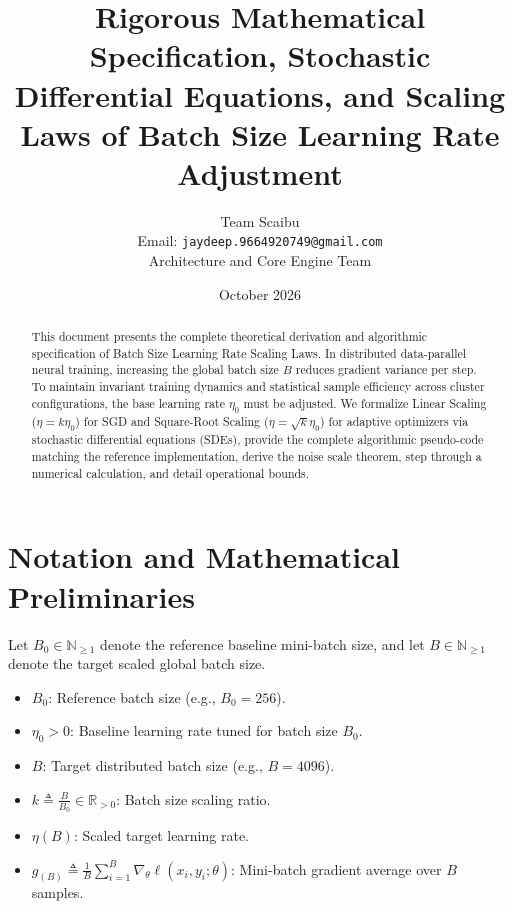 \documentclass[11pt,a4paper]{article}
\title{\textbf{Rigorous Mathematical Specification, Stochastic Differential Equations, and Scaling Laws of Batch Size Learning Rate Adjustment}}
\author{Team Scaibu \\ \small Email: \texttt{jaydeep.9664920749@gmail.com} \\ \small Architecture and Core Engine Team}
\date{October 2026}
\theoremstyle{definition}
\begin{document}
\maketitle

\begin{abstract}
This document presents the complete theoretical derivation and algorithmic specification of Batch Size Learning Rate Scaling Laws. In distributed data-parallel neural training, increasing the global batch size $B$ reduces gradient variance per step. To maintain invariant training dynamics and statistical sample efficiency across cluster configurations, the base learning rate $\eta_0$ must be adjusted. We formalize Linear Scaling ($\eta = k \eta_0$) for SGD and Square-Root Scaling ($\eta = \sqrt{k} \eta_0$) for adaptive optimizers via stochastic differential equations (SDEs), provide the complete algorithmic pseudo-code matching the reference implementation, derive the noise scale theorem, step through a numerical calculation, and detail operational bounds.
\end{abstract}

\section{Notation and Mathematical Preliminaries}

Let $B_0 \in \mathbb{N}_{\ge 1}$ denote the reference baseline mini-batch size, and let $B \in \mathbb{N}_{\ge 1}$ denote the target scaled global batch size.

\begin{itemize}
    \item $B_0$: Reference batch size (e.g., $B_0 = 256$).
    \item $\eta_0 > 0$: Baseline learning rate tuned for batch size $B_0$.
    \item $B$: Target distributed batch size (e.g., $B = 4096$).
    \item $k \triangleq \frac{B}{B_0} \in \mathbb{R}_{> 0}$: Batch size scaling ratio.
    \item $\eta(B)$: Scaled target learning rate.
    \item $g_{(B)} \triangleq \frac{1}{B} \sum_{i=1}^B \nabla_\theta \ell(x_i, y_i; \theta)$: Mini-batch gradient average over $B$ samples.
\end{itemize}
\end{document}
